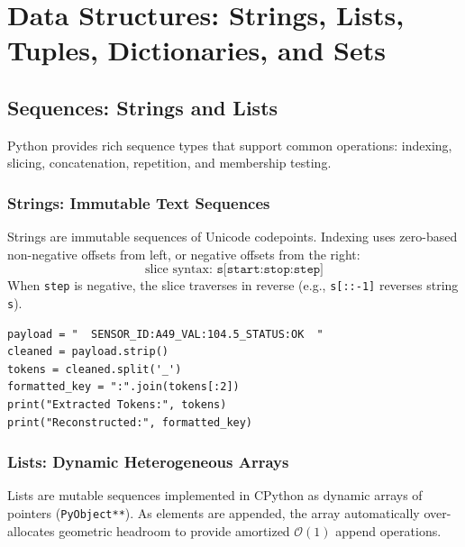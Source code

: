 \chapter{Data Structures: Strings, Lists, Tuples, Dictionaries, and Sets}
\label{ch:data_structures}

\section{Sequences: Strings and Lists}

Python provides rich sequence types that support common operations: indexing, slicing, concatenation, repetition, and membership testing.

\subsection{Strings: Immutable Text Sequences}
Strings are immutable sequences of Unicode codepoints. Indexing uses zero-based non-negative offsets from left, or negative offsets from the right:
\begin{equation}
\text{slice syntax: } \texttt{s[start:stop:step]}
\end{equation}
When \texttt{step} is negative, the slice traverses in reverse (e.g., \texttt{s[::-1]} reverses string \texttt{s}).

\begin{lstlisting}[caption={Key String Transformation Methods}]
payload = "  SENSOR_ID:A49_VAL:104.5_STATUS:OK  "
cleaned = payload.strip()
tokens = cleaned.split('_')
formatted_key = ":".join(tokens[:2])
print("Extracted Tokens:", tokens)
print("Reconstructed:", formatted_key)
\end{lstlisting}

\subsection{Lists: Dynamic Heterogeneous Arrays}
Lists are mutable sequences implemented in CPython as dynamic arrays of pointers (\texttt{PyObject**}). As elements are appended, the array automatically over-allocates geometric headroom to provide amortized $\mathcal{O}(1)$ append operations.


